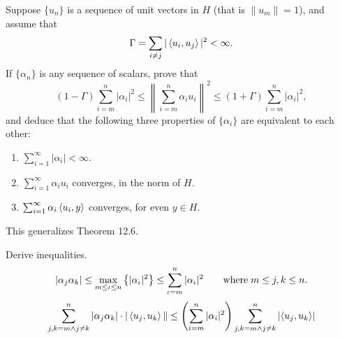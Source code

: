 \begin{enumerate}
\begin{excopy}
Suppose \(\{u_n\}\) is a sequence of unit vectors in $H$
(that is \(\|u_m\| = 1\)), and assume
that
\begin{equation*}
\Gamma = \sum_{i\neq j} |\left\langle u_i,u_j \right\rangle|^2 < \infty.
\end{equation*}
If \(\{\alpha_n\}\) is any sequence of scalars, prove that
\begin{equation*}
 (1 - \Gamma)\sum_{i=m}^n |\alpha_i|^2
 \leq \left\| \sum_{i=m}^n \alpha_i u_i \right\|^2
 \leq (1 + \Gamma) \sum_{i=m}^n |\alpha_i|^2 ,
\end{equation*}
and deduce that the following three properties of \(\{\alpha_i\}\)
are equivalent to each other:
\begin{enumerate}
\item \(\sum_{i=1}^\infty |\alpha_i| < \infty\).
\item \(\sum_{i=1}^\infty \alpha_i u_i\) converges, in the norm of $H$.
\item \(\sum_{i=1}^\infty \alpha_i \left\langle u_i,y \right\rangle\) converges,
  for even \(y\in H\).
\end{enumerate}
This generalizes Theorem 12.6.
\end{excopy}
\iffalse
Derive inequalities.
\begin{equation*}
|\alpha_j \alpha_k| \leq \max_{m\leq \iota \leq n}\left\{|\alpha_\iota|^2\right\}
\leq \sum_{\iota=m}^n |\alpha_\iota|^2
\qquad \textnormal{where}\; m \leq j,k \leq n.
\end{equation*}
\begin{equation*}
\sum_{j,k=m \wedge j\neq k}^n |\alpha_j \alpha_k|\cdot|\left\langle u_j, u_k \right\rangle\|
\leq \left(\sum_{i=m}^n |\alpha_i|^2\right)
  \sum_{j,k=m \wedge j\neq k}^n \left|\left\langle u_j, u_k \right\rangle\right|
\end{equation*}


\end{enumerate}
